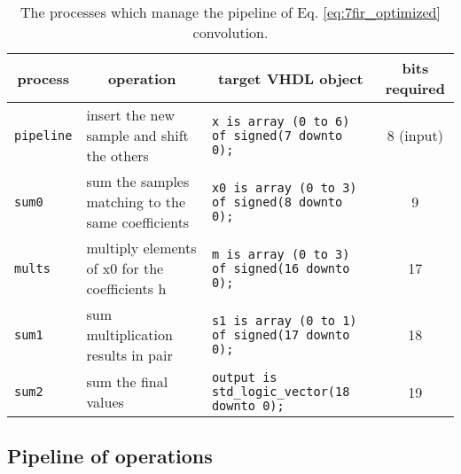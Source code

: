 \begin{table*}[hbp]
    \renewcommand{\arraystretch}{1.2}
    \centering
    \caption{The processes which manage the pipeline of Eq. \ref{eq:7fir_optimized} convolution. }
    \label{tab:pipeline}
\begin{tabular}{lllc}
\hline
\multicolumn{1}{c}{process} & \multicolumn{1}{c}{operation} & \multicolumn{1}{c}{target VHDL object} & \multicolumn{1}{c}{bits required} \\ \hline
\texttt{pipeline} & insert the new sample and shift the others & \texttt{x is array (0 to 6) of signed(7 downto 0);} & 8 (input) \\
\texttt{sum0} & sum the samples matching to the same coefficients & \texttt{x0 is array (0 to 3) of signed(8 downto 0);} & 9 \\
\texttt{mults} & multiply elements of x0 for the coefficients h & \texttt{m is array (0 to 3) of signed(16 downto 0);} & 17 \\
\texttt{sum1} & sum multiplication results in pair & \texttt{s1 is array (0 to 1) of signed(17 downto 0);} & 18  \\
\texttt{sum2} & sum the final values  & \texttt{output is std\_logic\_vector(18 downto 0);} & 19 \\ \hline
\end{tabular}
\end{table*}




\vspace{\fill}
\subsection{Pipeline of operations}
\label{ssec:pipeline}


